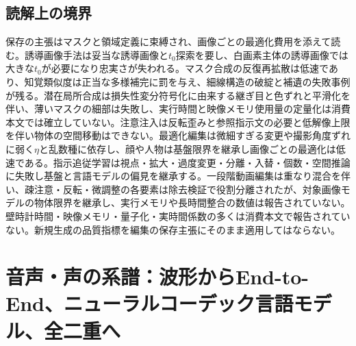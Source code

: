 \documentclass[lualatex,a4paper,10pt]{jlreq}
\begin{document}
\subsection*{読解上の境界}
保存の主張はマスクと領域定義に束縛され、画像ごとの最適化費用を添えて読む\autocite{btd044,btd045,btd046,btd047,btd048}。誘導画像手法は妥当な誘導画像と$t_0$探索を要し、白画素主体の誘導画像では大きな$t_0$が必要になり忠実さが失われる\autocite{btd044}。マスク合成の反復再拡散は低速であり、知覚類似度は正当な多様補完に罰を与え、細線構造の破綻と補遺の失敗事例が残る\autocite{btd045}。潜在局所合成は損失性変分符号化に由来する継ぎ目と色ずれと平滑化を伴い、薄いマスクの細部は失敗し、実行時間と映像メモリ使用量の定量化は消費本文では確立していない\autocite{btd046}。注意注入は反転歪みと参照指示文の必要と低解像上限を伴い物体の空間移動はできない\autocite{btd047}。最適化編集は微細すぎる変更や撮影角度ずれに弱く$\eta$と乱数種に依存し、顔や人物は基盤限界を継承し画像ごとの最適化は低速である\autocite{btd048}。指示追従学習は視点・拡大・過度変更・分離・入替・個数・空間推論に失敗し基盤と言語モデルの偏見を継承する\autocite{btd049}。一段階動画編集は重なり混合を伴い、疎注意・反転・微調整の各要素は除去検証で役割分離されたが、対象画像モデルの物体限界を継承し、実行メモリや長時間整合の数値は報告されていない\autocite{btd050}。壁時計時間・映像メモリ・量子化・実時間係数の多くは消費本文で報告されていない\autocite{btd044,btd045,btd046,btd047,btd048,btd049,btd050}。新規生成の品質指標を編集の保存主張にそのまま適用してはならない\autocite{btd044,btd045,btd046}。

\section{音声・声の系譜：波形からEnd-to-End、ニューラルコーデック言語モデル、全二重へ}\label{sec:speech}
\end{document}
